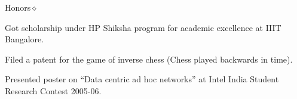 \documentclass{resume}
\begin{document}
\begin{category}{Honors}{$\diamond$}

    \item Got scholarship under HP Shiksha program for academic excellence at
        IIIT Bangalore.

    \item Filed a patent for the game of inverse chess (Chess played backwards
        in time).

    \item Presented poster on ``Data centric ad hoc networks'' at Intel India
        Student Research Contest 2005-06.

\end{category}
\end{document}
